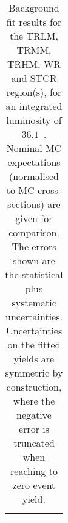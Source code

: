 \begin{table}
\begin{center}
{\begin{tabular*}{\textwidth}{@{\extracolsep{\fill}}lrrrrr}
\noalign{\smallskip}\hline\noalign{\smallskip}
\end{tabular*}
}
\end{center}
\caption{ Background fit results for the TRLM, TRMM, TRHM, WR and STCR region(s),  for an integrated luminosity of $36.1$~\ifb.
Nominal MC expectations (normalised to MC cross-sections) are given for comparison. 
The errors shown are the statistical plus systematic uncertainties.
Uncertainties on the fitted yields are symmetric by construction, 
where the negative error is truncated when reaching to zero event yield.
}
\label{table.results.yields.fit.CR}
\end{table}
%